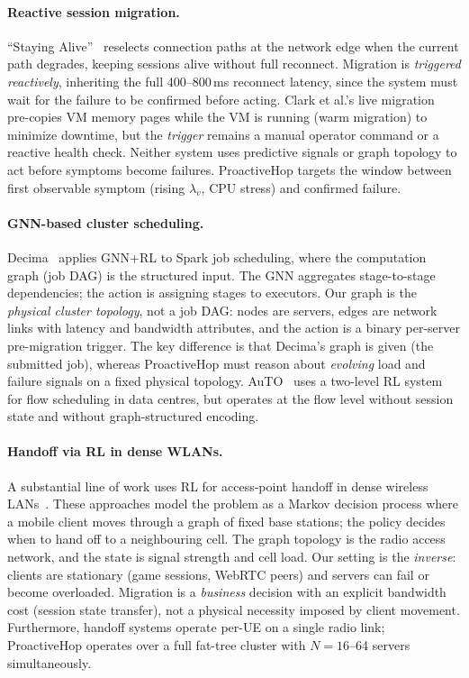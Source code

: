 \documentclass[review,1p]{elsarticle}
\theoremstyle{definition}
\begin{document}
\paragraph{Reactive session migration.}
``Staying Alive''~\cite{nsdi21stayingalive} reselects connection paths
at the network edge when the current path degrades, keeping sessions
alive without full reconnect.  Migration is \emph{triggered reactively},
inheriting the full 400--800\,ms reconnect latency, since
the system must wait for the failure to be confirmed before acting.
Clark et al.'s live migration~\cite{livemig2005} pre-copies VM
memory pages while the VM is running (warm migration) to minimize
downtime, but the \emph{trigger} remains a manual operator command or
a reactive health check.  Neither system uses predictive signals or
graph topology to act before symptoms become failures.
ProactiveHop targets the window between first observable symptom
(rising $\lambda_v$, CPU stress) and confirmed failure.

\paragraph{GNN-based cluster scheduling.}
Decima~\cite{sigcomm19decima} applies GNN+RL to Spark job scheduling,
where the computation graph (job DAG) is the structured input.
The GNN aggregates stage-to-stage dependencies; the action is
assigning stages to executors.  Our graph is the \emph{physical
cluster topology}, not a job DAG: nodes are servers, edges are network
links with latency and bandwidth attributes, and the action is a
binary per-server pre-migration trigger.  The key difference is that
Decima's graph is given (the submitted job), whereas ProactiveHop
must reason about \emph{evolving} load and failure signals on a fixed
physical topology.  AuTO~\cite{auto2018} uses a two-level RL system
for flow scheduling in data centres, but operates at the flow level
without session state and without graph-structured encoding.

\paragraph{Handoff via RL in dense WLANs.}
A substantial line of work uses RL for access-point handoff in dense
wireless LANs~\cite{5ghandoff}.  These approaches model the
problem as a Markov decision process where a mobile client moves
through a graph of fixed base stations; the policy decides when to
hand off to a neighbouring cell.  The graph topology is the radio
access network, and the state is signal strength and cell load.
Our setting is the \emph{inverse}: clients are stationary (game
sessions, WebRTC peers) and servers can fail or become overloaded.
Migration is a \emph{business} decision with an explicit bandwidth
cost (session state transfer), not a physical necessity imposed by
client movement.  Furthermore, handoff systems operate per-UE on a
single radio link; ProactiveHop operates over a full fat-tree cluster
with $N{=}16$--64 servers simultaneously.
\end{document}

